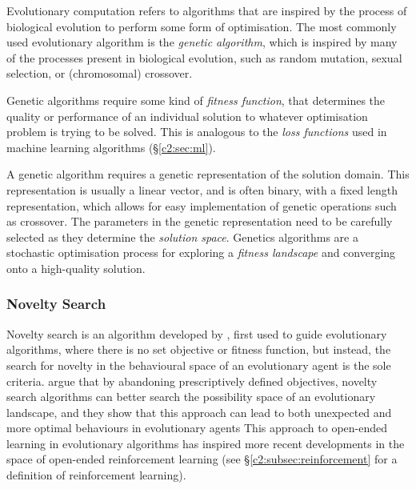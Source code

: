 Evolutionary computation refers to algorithms that are inspired by the process of biological evolution to perform some form of optimisation. 
The most commonly used evolutionary algorithm is the \textit{genetic algorithm}, which is inspired by many of the processes present in biological evolution, such as random mutation, sexual selection, or (chromosomal) crossover.

Genetic algorithms require some kind of \textit{fitness function}, that determines the quality or performance of an individual solution to whatever optimisation problem is trying to be solved. This is analogous to the \textit{loss functions} used in machine learning algorithms (\S \ref{c2:sec:ml}). 

A genetic algorithm requires a genetic representation of the solution domain. 
This representation is usually a linear vector, and is often binary, with a fixed length representation, which allows for easy implementation of genetic operations such as crossover. 
The parameters in the genetic representation need to be carefully selected as they determine the \textit{solution space}.
Genetics algorithms are a stochastic optimisation process for exploring a \textit{fitness landscape} and converging onto a high-quality solution. 


\subsubsection{Novelty Search}

Novelty search is an algorithm developed by \cite{lehman2008exploiting}, first used to guide evolutionary algorithms, where there is no set objective or fitness function, but instead, the search for novelty in the behavioural space of an evolutionary agent is the sole criteria. \cite{lehman2010efficiently, lehman2011novelty, lehman2011abandoning} argue that by abandoning prescriptively defined objectives, novelty search algorithms can better search the possibility space of an evolutionary landscape, and they show that this approach can lead to both unexpected and more optimal behaviours in evolutionary agents This approach to open-ended learning in evolutionary algorithms has inspired more recent developments in the space of open-ended reinforcement learning \citep{wang2020enhanced} (see \S \ref{c2:subsec:reinforcement} for a definition of reinforcement learning).

